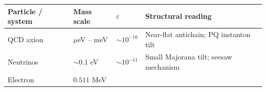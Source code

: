 \documentclass[12pt,a4paper]{article}
\begin{document}
\begin{longtable}[]{@{}llll@{}}
\toprule
\begin{minipage}[b]{0.22\columnwidth}\raggedright
Particle / system\strut
\end{minipage} & \begin{minipage}[b]{0.22\columnwidth}\raggedright
Mass scale\strut
\end{minipage} & \begin{minipage}[b]{0.22\columnwidth}\raggedright
\(\varepsilon\)\strut
\end{minipage} & \begin{minipage}[b]{0.22\columnwidth}\raggedright
Structural reading\strut
\end{minipage}\tabularnewline
\midrule
\endhead
\begin{minipage}[t]{0.22\columnwidth}\raggedright
QCD axion\strut
\end{minipage} & \begin{minipage}[t]{0.22\columnwidth}\raggedright
\(\mu\)eV -- meV\strut
\end{minipage} & \begin{minipage}[t]{0.22\columnwidth}\raggedright
\(\sim 10^{-16}\)\strut
\end{minipage} & \begin{minipage}[t]{0.22\columnwidth}\raggedright
Near-flat antichain; PQ instanton tilt\strut
\end{minipage}\tabularnewline
\begin{minipage}[t]{0.22\columnwidth}\raggedright
Neutrinos\strut
\end{minipage} & \begin{minipage}[t]{0.22\columnwidth}\raggedright
\(\sim 0.1\) eV\strut
\end{minipage} & \begin{minipage}[t]{0.22\columnwidth}\raggedright
\(\sim 10^{-11}\)\strut
\end{minipage} & \begin{minipage}[t]{0.22\columnwidth}\raggedright
Small Majorana tilt; seesaw mechanism\strut
\end{minipage}\tabularnewline
\begin{minipage}[t]{0.22\columnwidth}\raggedright
Electron\strut
\end{minipage} & \begin{minipage}[t]{0.22\columnwidth}\raggedright
\(0.511\) MeV\strut
\end{minipage} & \begin{minipage}[t]{0.22\columnwidth}\raggedright

\end{minipage}
\end{longtable}
\end{document}
